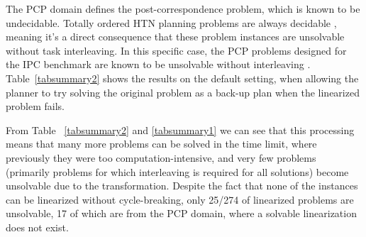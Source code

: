 The PCP domain defines the post-correspondence problem, which is known to be undecidable. Totally ordered HTN planning problems are always decidable \cite{ErolHTNExpressivity}, meaning it's a direct consequence that these problem instances are unsolvable without task interleaving. In this specific case, the PCP problems designed for the IPC benchmark are known to be unsolvable without interleaving \cite{PCPDomain}. Table~\ref{tabsummary2} shows the results on the default setting, when allowing the planner to try solving the original problem as a back-up plan when the linearized problem fails. 




From Table ~\ref{tabsummary2} and \ref{tabsummary1} we can see that this processing means that many more problems can be solved in the time limit, where previously they were too computation-intensive, and very few problems (primarily problems for which interleaving is required for all solutions) become unsolvable due to the transformation. Despite the fact that none of the instances can be linearized without cycle-breaking, only 25/274 of linearized problems are unsolvable, 17 of which are from the PCP domain, where a solvable linearization does not exist.
